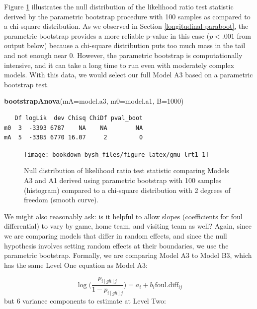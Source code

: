 \documentclass[
]{krantz}
\newenvironment{Shaded}{\begin{snugshade}}{\end{snugshade}}
\newcommand{\DataTypeTok}[1]{\textcolor[rgb]{0.27,0.27,0.27}{#1}}
\newcommand{\DecValTok}[1]{\textcolor[rgb]{0.06,0.06,0.06}{#1}}
\newcommand{\KeywordTok}[1]{\textcolor[rgb]{0.27,0.27,0.27}{\textbf{#1}}}
\newcommand{\NormalTok}[1]{#1}
\begin{document}
Figure \ref{fig:gmu-lrt1} illustrates the null distribution of the likelihood ratio test statistic derived by the parametric bootstrap procedure with 100 samples as compared to a chi-square distribution. As we observed in Section \ref{longitudinal-paraboot}, the parametric bootstrap provides a more reliable p-value in this case (\(p<.001\) from output below) because a chi-square distribution puts too much mass in the tail and not enough near 0. However, the parametric bootstrap is computationally intensive, and it can take a long time to run even with moderately complex models. With this data, we would select our full Model A3 based on a parametric bootstrap test.

\begin{Shaded}
\begin{Highlighting}[]
\KeywordTok{bootstrapAnova}\NormalTok{(}\DataTypeTok{mA=}\NormalTok{model.a3, }\DataTypeTok{m0=}\NormalTok{model.a1, }\DataTypeTok{B=}\DecValTok{1000}\NormalTok{)}
\end{Highlighting}
\end{Shaded}

\begin{verbatim}
   Df logLik  dev Chisq ChiDf pval_boot
m0  3  -3393 6787    NA    NA        NA
mA  5  -3385 6770 16.07     2         0
\end{verbatim}

\begin{figure}

{\centering \texttt{[image: bookdown-bysh\_files/figure-latex/gmu-lrt1-1]} 

}

\caption{Null distribution of likelihood ratio test statistic comparing Models A3 and A1 derived using parametric bootstrap with 100 samples (histogram) compared to a chi-square distribution with 2 degrees of freedom (smooth curve).}\label{fig:gmu-lrt1}
\end{figure}

We might also reasonably ask: is it helpful to allow slopes (coefficients for foul differential) to vary by game, home team, and visiting team as well? Again, since we are comparing models that differ in random effects, and since the null hypothesis involves setting random effects at their boundaries, we use the parametric bootstrap. Formally, we are comparing Model A3 to Model B3, which has the same Level One equation as Model A3:

\[ \log\bigg(\frac{p_{i[gh]j}}{1-p_{i[gh]j}}\bigg)=a_{i}+b_{i}\mathrm{foul.diff}_{ij} \]
but 6 variance components to estimate at Level Two:
\end{document}
